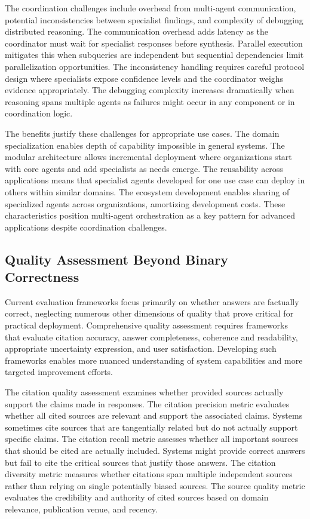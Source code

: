 The coordination challenges include overhead from multi-agent communication, potential inconsistencies between specialist findings, and complexity of debugging distributed reasoning. The communication overhead adds latency as the coordinator must wait for specialist responses before synthesis. Parallel execution mitigates this when subqueries are independent but sequential dependencies limit parallelization opportunities. The inconsistency handling requires careful protocol design where specialists expose confidence levels and the coordinator weighs evidence appropriately. The debugging complexity increases dramatically when reasoning spans multiple agents as failures might occur in any component or in coordination logic.

The benefits justify these challenges for appropriate use cases. The domain specialization enables depth of capability impossible in general systems. The modular architecture allows incremental deployment where organizations start with core agents and add specialists as needs emerge. The reusability across applications means that specialist agents developed for one use case can deploy in others within similar domains. The ecosystem development enables sharing of specialized agents across organizations, amortizing development costs. These characteristics position multi-agent orchestration as a key pattern for advanced applications despite coordination challenges.

\subsection{Quality Assessment Beyond Binary Correctness}

Current evaluation frameworks focus primarily on whether answers are factually correct, neglecting numerous other dimensions of quality that prove critical for practical deployment. Comprehensive quality assessment requires frameworks that evaluate citation accuracy, answer completeness, coherence and readability, appropriate uncertainty expression, and user satisfaction. Developing such frameworks enables more nuanced understanding of system capabilities and more targeted improvement efforts.

The citation quality assessment examines whether provided sources actually support the claims made in responses. The citation precision metric evaluates whether all cited sources are relevant and support the associated claims. Systems sometimes cite sources that are tangentially related but do not actually support specific claims. The citation recall metric assesses whether all important sources that should be cited are actually included. Systems might provide correct answers but fail to cite the critical sources that justify those answers. The citation diversity metric measures whether citations span multiple independent sources rather than relying on single potentially biased sources. The source quality metric evaluates the credibility and authority of cited sources based on domain relevance, publication venue, and recency.

